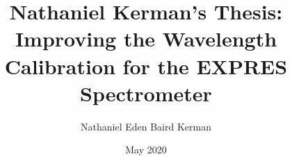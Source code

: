 \documentclass[12pt]{yalephd}
\begin{document}
\newcommand{\unit}[1]{\ensuremath{\, \mathrm{#1}}}

\titlespacing*{\chapter}{0pt}{50pt}{30pt}%

	\title{Nathaniel Kerman's Thesis:\\\large Improving the Wavelength Calibration for the EXPRES Spectrometer}
	\author{Nathaniel Eden Baird Kerman}
	\date{May 2020}


    
	
    \maketitle
    \makecopyright
	
    
    
	
    \tableofcontents %
    \listoffigures   %
    \listoftables    %
    
    \mainmatter      %

	
	
% 	


    
    
\end{document}
